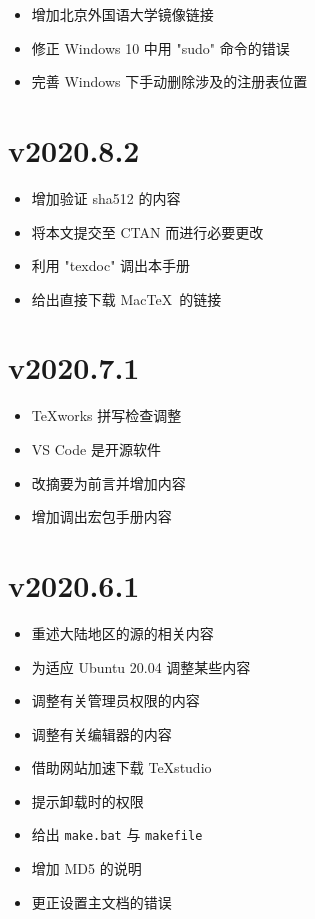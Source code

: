 \begin{itemize}
  \item 增加北京外国语大学镜像链接
  \item 修正 Windows 10 中用 "sudo" 命令的错误
  \item 完善 Windows 下手动删除涉及的注册表位置
\end{itemize}

\section*{v2020.8.2}

\begin{itemize}
  \item 增加验证 sha512 的内容
  \item 将本文提交至 CTAN 而进行必要更改
  \item 利用 "texdoc" 调出本手册
  \item 给出直接下载 Mac\TeX\ 的链接
\end{itemize}

\section*{v2020.7.1}

\begin{itemize}
  \item \TeX works 拼写检查调整
  \item VS Code 是开源软件
  \item 改摘要为前言并增加内容
  \item 增加调出宏包手册内容
\end{itemize}

\section*{v2020.6.1}

\begin{itemize}
  \item 重述大陆地区的源的相关内容
  \item 为适应 Ubuntu 20.04 调整某些内容
  \item 调整有关管理员权限的内容
  \item 调整有关编辑器的内容
  \item 借助网站加速下载 TeXstudio
  \item 提示卸载时的权限
  \item 给出 \texttt{make.bat} 与 \texttt{makefile}
  \item 增加 MD5 的说明
  \item 更正设置主文档的错误
\end{itemize}

